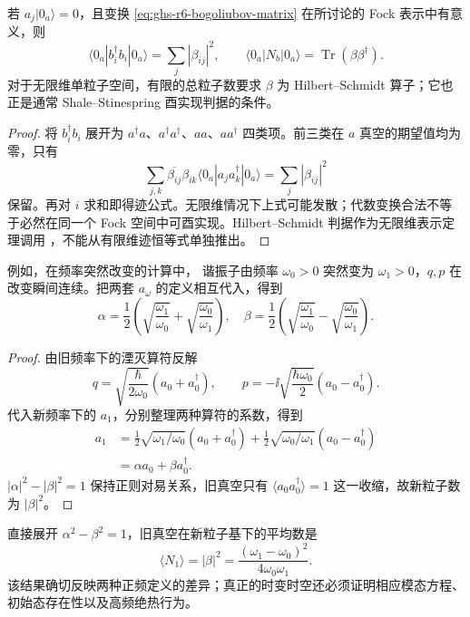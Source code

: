 \begin{theorem}[两种真空的粒子数]\label{thm:ghs-r6-bogoliubov-number}
若 $a_j|0_a\rangle=0$，且变换 \cref{eq:ghs-r6-bogoliubov-matrix} 在所讨论的 Fock 表示中有意义，则
\begin{equation}\label{eq:ghs-r6-created-particles}
\langle0_a|b_i^\dagger b_i|0_a\rangle=\sum_j|\beta_{ij}|^2,
\qquad \langle0_a|N_b|0_a\rangle=\operatorname{Tr}(\beta\beta^\dagger).
\end{equation}
对于无限维单粒子空间，有限的总粒子数要求 $\beta$ 为 Hilbert--Schmidt 算子；它也正是通常 Shale--Stinespring 酉实现判据的条件。
\end{theorem}
\begin{proof}
将 $b_i^\dagger b_i$ 展开为 $a^\dagger a$、$a^\dagger a^\dagger$、$aa$、$aa^\dagger$ 四类项。前三类在 $a$ 真空的期望值均为零，只有
\[
\sum_{j,k}\overline{\beta_{ij}}\beta_{ik}\langle0_a|a_ja_k^\dagger|0_a\rangle
=\sum_j|\beta_{ij}|^2
\]
保留。再对 $i$ 求和即得迹公式。无限维情况下上式可能发散；代数变换合法不等于必然在同一个 Fock 空间中可酉实现。Hilbert--Schmidt 判据作为无限维表示定理调用 \cite{ghs-r6-shale}，不能从有限维迹恒等式单独推出。
\end{proof}


例如，在频率突然改变的计算中，
谐振子由频率 $\omega_0>0$ 突然变为 $\omega_1>0$，$q,p$ 在改变瞬间连续。把两套 $a_\omega$ 的定义相互代入，得到
\begin{equation}\label{eq:ghs-sudden-quench-bogoliubov}
\alpha=\frac12\left(\sqrt{\frac{\omega_1}{\omega_0}}+\sqrt{\frac{\omega_0}{\omega_1}}\right),\quad
\beta=\frac12\left(\sqrt{\frac{\omega_1}{\omega_0}}-\sqrt{\frac{\omega_0}{\omega_1}}\right).
\end{equation}
\begin{proof}
由旧频率下的湮灭算符反解
\[
 q=\sqrt{\frac{\hbar}{2\omega_0}}(a_0+a_0^\dagger),\qquad
 p=-\ii\sqrt{\frac{\hbar\omega_0}{2}}(a_0-a_0^\dagger).
\]
代入新频率下的 $a_1$，分别整理两种算符的系数，得到
\begin{align*}
 a_1&=\tfrac12\sqrt{\omega_1/\omega_0}(a_0+a_0^\dagger)
      +\tfrac12\sqrt{\omega_0/\omega_1}(a_0-a_0^\dagger)\\
 &=\alpha a_0+\beta a_0^\dagger.
\end{align*}
$|\alpha|^2-|\beta|^2=1$ 保持正则对易关系，旧真空只有 $\langle a_0a_0^\dagger\rangle=1$ 这一收缩，故新粒子数为 $|\beta|^2$。
\end{proof}

直接展开 $\alpha^2-\beta^2=1$，旧真空在新粒子基下的平均数是
\begin{equation}\label{eq:ghs-r6-quench-number}
\langle N_1\rangle=|\beta|^2
=\frac{(\omega_1-\omega_0)^2}{4\omega_0\omega_1}.
\end{equation}
该结果确切反映两种正频定义的差异；真正的时变时空还必须证明相应模态方程、初始态存在性以及高频绝热行为。


